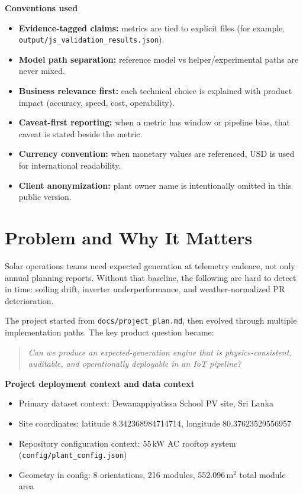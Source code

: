 \documentclass[11pt,a4paper]{article}
\newcommand{\artifact}[1]{\texttt{#1}}
\begin{document}
\textbf{Conventions used}
\begin{itemize}
  \item \textbf{Evidence-tagged claims:} metrics are tied to explicit files (for example, \artifact{output/js\_validation\_results.json}).
  \item \textbf{Model path separation:} reference model vs helper/experimental paths are never mixed.
  \item \textbf{Business relevance first:} each technical choice is explained with product impact (accuracy, speed, cost, operability).
  \item \textbf{Caveat-first reporting:} when a metric has window or pipeline bias, that caveat is stated beside the metric.
  \item \textbf{Currency convention:} when monetary values are referenced, USD is used for international readability.
  \item \textbf{Client anonymization:} plant owner name is intentionally omitted in this public version.
\end{itemize}

\section{Problem and Why It Matters}

Solar operations teams need expected generation at telemetry cadence, not only annual planning reports.
Without that baseline, the following are hard to detect in time: soiling drift, inverter underperformance,
and weather-normalized PR deterioration.

The project started from \artifact{docs/project\_plan.md}, then evolved through multiple implementation paths.
The key product question became:

\begin{quote}
\textit{Can we produce an expected-generation engine that is physics-consistent, auditable, and operationally deployable in an IoT pipeline?}
\end{quote}

\textbf{Project deployment context and data context}
\begin{itemize}
  \item Primary dataset context: Dewanappiyatissa School PV site, Sri Lanka
  \item Site coordinates: latitude 8.342368984714714, longitude 80.37623529556957
  \item Repository configuration context: 55\,kW AC rooftop system (\artifact{config/plant\_config.json})
  \item Geometry in config: 8 orientations, 216 modules, 552.096\,m$^2$ total module area
\end{itemize}
\end{document}
